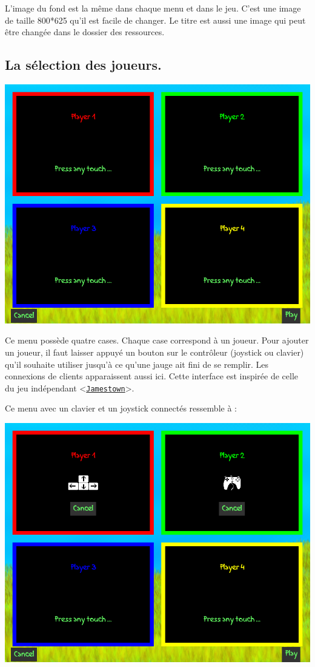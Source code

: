 \documentclass{article}
\begin{document}
L'image du fond est la même dans chaque menu et dans le jeu. C'est une image de taille 800*625 qu'il est facile de changer. Le titre est aussi une image qui peut être changée dans le dossier des ressources.

\subsection{La sélection des joueurs.} \label{select}
\begin{center}
	\includegraphics[scale=0.4]{img/empty.png}
\end{center}
Ce menu possède quatre cases. Chaque case correspond à un joueur. Pour ajouter un joueur, il faut laisser appuyé un bouton sur le contrôleur (joystick ou clavier) qu'il souhaite utiliser jusqu'à ce qu'une jauge ait fini de se remplir. Les connexions de clients apparaissent aussi ici. Cette interface est inspirée de celle du jeu indépendant <\href{http://www.finalformgames.com/jamestown/}{\nolinkurl{Jamestown}}>.

Ce menu avec un clavier et un joystick connectés ressemble à :
\begin{center}
	\includegraphics[scale=0.4]{img/full.png}
\end{center}
\end{document}
